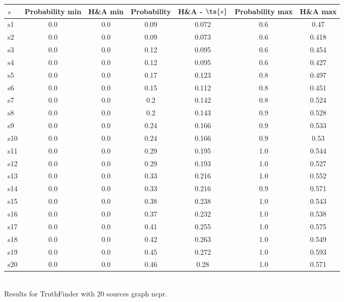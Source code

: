 \documentclass{article}
\begin{document}
\noindent\begin{tabular}{|l|c|c|c|c|c|c|}
\hline
$s$& Probability min & H\&A min & Probability & H\&A - $\ts{s}$ & Probability max & H\&A max\\
\hline
s1 &0.0 & 0.0 & 0.09 & 0.072 & 0.6 & 0.47\\
\hline
s2 &0.0 & 0.0 & 0.09 & 0.073 & 0.6 & 0.418\\
\hline
s3 &0.0 & 0.0 & 0.12 & 0.095 & 0.6 & 0.454\\
\hline
s4 &0.0 & 0.0 & 0.12 & 0.095 & 0.6 & 0.427\\
\hline
s5 &0.0 & 0.0 & 0.17 & 0.123 & 0.8 & 0.497\\
\hline
s6 &0.0 & 0.0 & 0.15 & 0.112 & 0.8 & 0.451\\
\hline
s7 &0.0 & 0.0 & 0.2 & 0.142 & 0.8 & 0.524\\
\hline
s8 &0.0 & 0.0 & 0.2 & 0.143 & 0.9 & 0.528\\
\hline
s9 &0.0 & 0.0 & 0.24 & 0.166 & 0.9 & 0.533\\
\hline
s10 &0.0 & 0.0 & 0.24 & 0.166 & 0.9 & 0.53\\
\hline
s11 &0.0 & 0.0 & 0.29 & 0.195 & 1.0 & 0.544\\
\hline
s12 &0.0 & 0.0 & 0.29 & 0.193 & 1.0 & 0.527\\
\hline
s13 &0.0 & 0.0 & 0.33 & 0.216 & 1.0 & 0.552\\
\hline
s14 &0.0 & 0.0 & 0.33 & 0.216 & 0.9 & 0.571\\
\hline
s15 &0.0 & 0.0 & 0.38 & 0.238 & 1.0 & 0.543\\
\hline
s16 &0.0 & 0.0 & 0.37 & 0.232 & 1.0 & 0.538\\
\hline
s17 &0.0 & 0.0 & 0.41 & 0.255 & 1.0 & 0.575\\
\hline
s18 &0.0 & 0.0 & 0.42 & 0.263 & 1.0 & 0.549\\
\hline
s19 &0.0 & 0.0 & 0.45 & 0.272 & 1.0 & 0.593\\
\hline
s20 &0.0 & 0.0 & 0.46 & 0.28 & 1.0 & 0.571\\
\hline
\end{tabular}\\

\noindent Results for TruthFinder with 20 sources graph ncpr.
\end{document}
